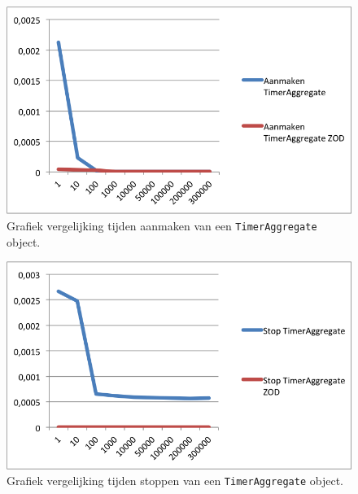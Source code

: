 \begin{figure}[!h]
  \centering
  \includegraphics[scale=1.0]{Afbeeldingen/Evaluatie/AanmakenTimerAggregate}
  \caption{Grafiek vergelijking tijden aanmaken van een \texttt{TimerAggregate} object.}
  \label{fig:GraphTimerAggregate}
\end{figure}

\begin{figure}[!h]
  \centering
  \includegraphics[scale=1.0]{Afbeeldingen/Evaluatie/StopTimerAggregate}
  \caption{Grafiek vergelijking tijden stoppen van een \texttt{TimerAggregate} object.}
  \label{fig:GraphTimerAggregateStop}
\end{figure}



